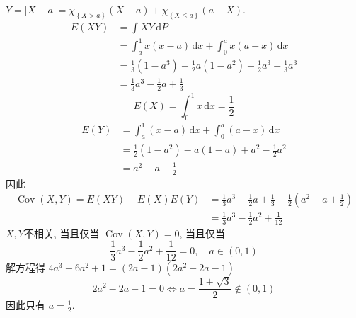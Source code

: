 \documentclass[../main.tex]{subfiles}
\begin{document}
\begin{solution}
  \(  Y= \left| X-a \right|= \chi _{\left\{ X> a \right\}}\left( X-a \right)+ \chi _{\left\{ X\le a \right\}}\left( a-X \right)     \). \[
  \begin{aligned}
  E\left( XY \right)&= \int XY \,\mathrm{d} P\\ 
   &= \int_{a}^{1}x \left( x-a \right) \,\mathrm{d} x+  \int_{0}^{a}x\left( a-x \right)\,\mathrm{d} x    \\ 
   &= \frac{1}{3}\left( 1-a^{3} \right)- \frac{1}{2}a\left( 1-a^{2} \right)+  \frac{1}{2}a^{3}-\frac{1}{3}a^{3}\\ 
    &= \frac{1}{3}a^{3}-\frac{1}{2}a+ \frac{1}{3}  
  \end{aligned}
  \] \[
  E\left( X \right)= \int_{0}^{1}x\,\mathrm{d} x= \frac{1}{2} 
  \] \[
  \begin{aligned}
  E\left( Y \right)&= \int_{a}^{1}\left( x-a \right)\,\mathrm{d} x+ \int_{0}^{a}\left( a-x \right)\,\mathrm{d} x \\ 
   &= \frac{1}{2}\left( 1-a^{2} \right)- a\left( 1-a \right)+ a^{2}-\frac{1}{2}a^{2}\\ 
    &= a^{2}-a+ \frac{1}{2}  
  \end{aligned}   
  \]  因此 \[
  \begin{aligned}
  \operatorname{Cov}\left( X,Y \right)= E\left( XY \right)-E\left( X \right)E\left( Y \right)&= \frac{1}{3}a^{3}-\frac{1}{2}a+ \frac{1}{3}-\frac{1}{2}\left( a^{2}-a+ \frac{1}{2} \right) \\ 
   &= \frac{1}{3}a^{3}-\frac{1}{2}a^{2}+ \frac{1}{12}   
  \end{aligned}  
  \] \(  X,Y  \)不相关, 当且仅当 \(  \operatorname{Cov}\left( X,Y \right)= 0   \), 当且仅当 \[
  \frac{1}{3}a^{3}-\frac{1}{2}a^{2}+ \frac{1}{12}= 0,\quad a\in \left( 0,1 \right) 
  \]  解方程得  \(  4a^{3}-6a^{2}+ 1=\left( 2a-1 \right)\left( 2a^{2}-2a-1 \right)    \) \[
  2a^{2}-2a-1= 0\iff a=  \frac{1\pm \sqrt{3} }{2 }  \not \in \left( 0,1 \right) 
  \] 因此只有 \(  a= \frac{1}{2}  \). 
\end{solution}
\end{document}
